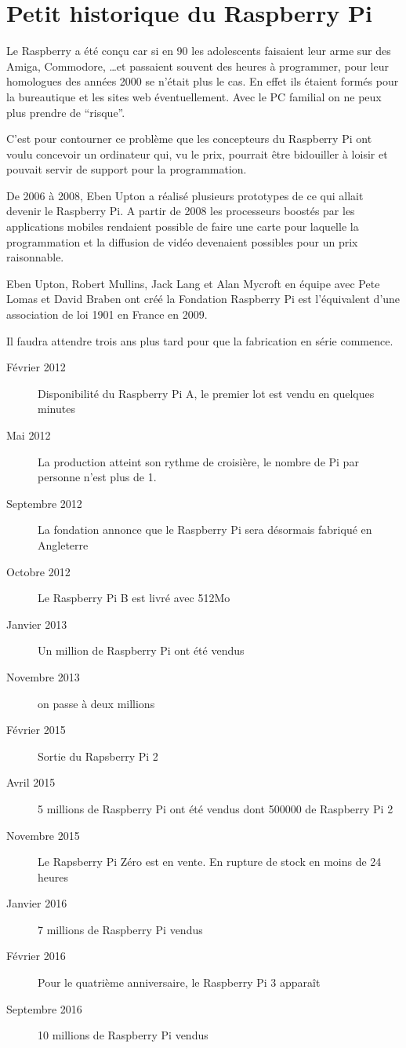 \section{Petit historique du Raspberry Pi}

Le Raspberry a été conçu car si en 90 les adolescents faisaient leur arme sur des Amiga, Commodore, \dots et passaient souvent des heures à programmer, pour leur homologues des années 2000 se n'était plus le cas. En effet ils étaient formés pour la bureautique et les sites web éventuellement. Avec le PC familial on ne peux plus prendre de ``risque''.

C'est pour contourner ce problème que les concepteurs du Raspberry Pi ont voulu concevoir un ordinateur qui, vu le prix, pourrait être bidouiller à loisir et pouvait servir de support pour la programmation.

De 2006 à 2008, Eben Upton a réalisé plusieurs prototypes de ce qui allait devenir le Raspberry Pi. A partir de 2008 les processeurs boostés par les applications mobiles rendaient possible de faire une carte pour laquelle la programmation et la diffusion de vidéo devenaient possibles pour un prix raisonnable.

Eben Upton, Robert Mullins, Jack Lang et Alan Mycroft en équipe avec Pete Lomas et David Braben ont créé la Fondation Raspberry Pi est l'équivalent d'une association de loi 1901 en France en 2009. 

Il faudra attendre trois ans plus tard pour que la fabrication en série commence.

\begin{description}
	\item[Février 2012] Disponibilité  du Raspberry Pi A, le premier lot est vendu en quelques minutes
	\item[Mai 2012] La production atteint son rythme de croisière, le nombre de Pi par personne n'est plus de 1.
	\item[Septembre 2012] La fondation annonce que le Raspberry Pi sera désormais fabriqué en Angleterre
	\item[Octobre 2012] Le Raspberry Pi B est livré avec 512Mo
	\item[Janvier 2013] Un million de Raspberry Pi ont été vendus
	\item[Novembre 2013] on passe à deux millions
	\item[Février 2015] Sortie du Rapsberry Pi 2
	\item[Avril 2015] 5 millions de Raspberry Pi ont été vendus dont 500000 de Raspberry Pi 2
	\item[Novembre 2015] Le Rapsberry Pi Zéro est en vente. En rupture de stock en moins de 24 heures
	\item[Janvier 2016] 7 millions de Raspberry Pi vendus
	\item[Février 2016] Pour le quatrième anniversaire, le Raspberry Pi 3 apparaît
	\item[Septembre 2016] 10 millions de Raspberry Pi vendus
\end{description}

